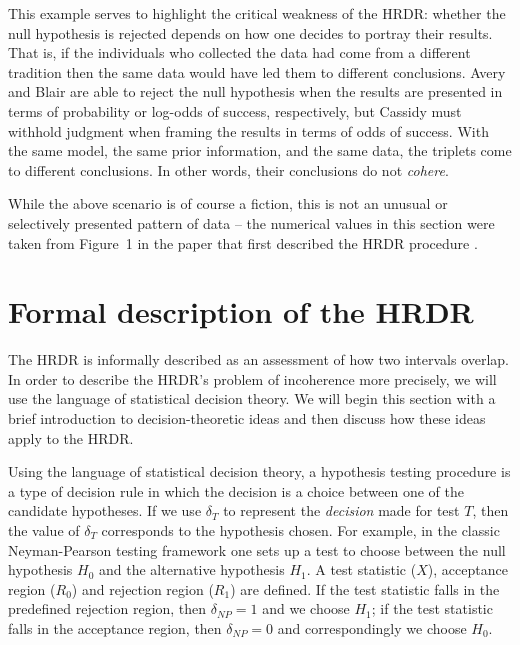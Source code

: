 \documentclass[9pt,twocolumn,twoside]{cidlab-draft}\templatetype{cidlab-invited}
\newcommand{\hdr}{HRDR}
\begin{document}
\noindent This example serves to highlight the critical weakness of the \hdr{}: whether the null hypothesis is rejected depends on how one decides to portray their results.  That is, if the individuals who collected the data had come from a different tradition then the same data would have led them to different conclusions. Avery and Blair are able to reject the null hypothesis when the results are presented in terms of probability or log-odds of success, respectively, but Cassidy must withhold judgment when framing the results in terms of odds of success.  With the same model, the same prior information, and the same data, the triplets come to different conclusions. In other words, their conclusions do not \textit{cohere}. 

While the above scenario is of course a fiction, this is not an unusual or selectively presented pattern of data -- the numerical values in this section were taken from Figure~1 in the paper that first described the \hdr{} procedure \cite{Kruschke2011}.

\section*{Formal description of the \hdr{}}

The \hdr{} is informally described as an assessment of how two intervals overlap. In order to describe the \hdr{}'s problem of incoherence more precisely, we will use the language of statistical decision theory.  We will begin this section with a brief introduction to decision-theoretic ideas and then discuss how these ideas apply to the \hdr{}.
 
Using the language of statistical decision theory, a hypothesis testing procedure is a type of decision rule in which the decision is a choice between one of the candidate hypotheses. If we use $\delta_T$ to represent the \textit{decision} made for test $T$, then the value of $\delta_T$ corresponds to the hypothesis chosen. For example, in the classic Neyman-Pearson testing framework one sets up a test to choose between the null hypothesis $H_0$ and the alternative hypothesis $H_1$. A test statistic ($X$), acceptance region ($R_0$) and rejection region ($R_1$) are defined. If the test statistic falls in the predefined rejection region, then $\delta_{NP}=1$ and we choose $H_1$; if the test statistic falls in the acceptance region, then $\delta_{NP}=0$ and correspondingly we choose $H_0$.
\end{document}
